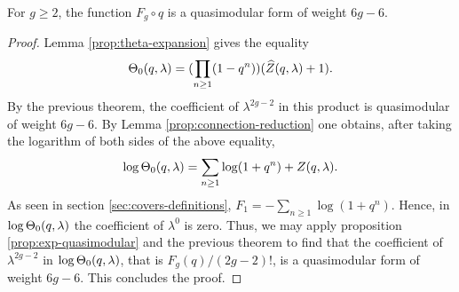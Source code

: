 \begin{thm}[Dijgraaf]
 For $g\geq 2$, the function $F_g\circ q$ is a quasimodular form of weight $6g-6$.
\end{thm}
\begin{proof}
 Lemma \ref{prop:theta-expansion} gives the equality
 \[
  \Theta_0(q,\lambda)=(\prod_{n\geq 1}(1-q^n))(\widehat{Z}(q,\lambda)+1).
 \]
 By the previous theorem, the coefficient of $\lambda^{2g-2}$ in this product is quasimodular of weight $6g-6$. By Lemma \ref{prop:connection-reduction} one obtains, after taking the logarithm of both sides of the above equality,
 \[
  \log\Theta_0(q,\lambda)=\sum_{n\geq 1}\log(1+q^n) + Z(q,\lambda).
 \]
 As seen in section \ref{sec:covers-definitions}, $F_1=-\sum_{n\geq 1}\log(1+q^n)$. Hence, in $\log\Theta_0(q,\lambda)$ the coefficient of $\lambda^0$ is zero. Thus, we may apply proposition \ref{prop:exp-quasimodular} and the previous theorem to find that the coefficient of $\lambda^{2g-2}$ in $\log\Theta_0(q,\lambda)$, that is $F_g(q)/(2g-2)!$, is a quasimodular form of weight $6g-6$. This concludes the proof.
\end{proof}